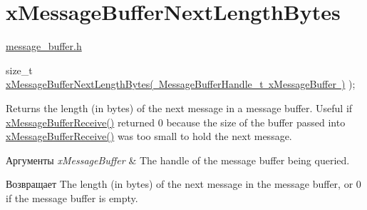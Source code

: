 \hypertarget{group__x_message_buffer_next_length_bytes}{}\section{x\+Message\+Buffer\+Next\+Length\+Bytes}
\label{group__x_message_buffer_next_length_bytes}
\mbox{\hyperlink{message__buffer_8h}{message\+\_\+buffer.\+h}} 
\begin{DoxyPre}
size\_t \mbox{\hyperlink{message__buffer_8h_ae2b56b6564cf2476891394231a31ecad}{xMessageBufferNextLengthBytes( MessageBufferHandle\_t xMessageBuffer )}} );
\end{DoxyPre}
 Returns the length (in bytes) of the next message in a message buffer. Useful if \mbox{\hyperlink{message__buffer_8h_af12a227ba511a95cbea5aa81c7f3ba12}{x\+Message\+Buffer\+Receive()}} returned 0 because the size of the buffer passed into \mbox{\hyperlink{message__buffer_8h_af12a227ba511a95cbea5aa81c7f3ba12}{x\+Message\+Buffer\+Receive()}} was too small to hold the next message.


\begin{DoxyParams}{Аргументы}
{\em x\+Message\+Buffer} & The handle of the message buffer being queried.\\
\hline
\end{DoxyParams}
\begin{DoxyReturn}{Возвращает}
The length (in bytes) of the next message in the message buffer, or 0 if the message buffer is empty. 
\end{DoxyReturn}
